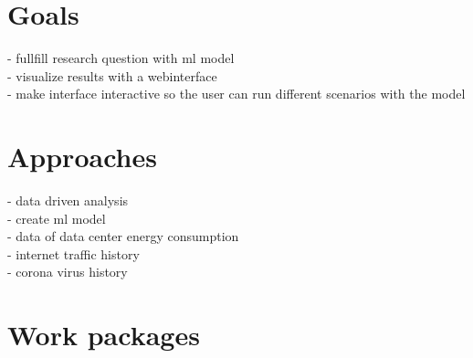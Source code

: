 \documentclass[lang=english,inputenc=utf8,fontsize=10pt]{ldvarticle}
\begin{document}
\section*{Goals}


- fullfill research question with ml model\\
- visualize results with a webinterface \\
- make interface interactive so the user can run different scenarios with the model


\section*{Approaches}


- data driven analysis \\
- create ml model \\
- data of data center energy consumption \\
- internet traffic history \\
- corona virus history 

\section{Work packages}
\end{document}

